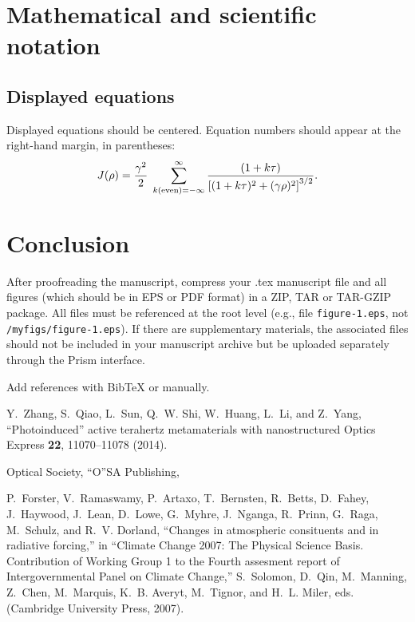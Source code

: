 \documentclass[twocolumn]{article}
\begin{document}
\section{Mathematical and scientific notation}

\subsection{Displayed equations} Displayed equations should be centered.
Equation numbers should appear at the right-hand margin, in
parentheses:
\begin{equation}
J(\rho) =
 \frac{\gamma^2}{2} \; \sum_{k({\rm even}) = -\infty}^{\infty}
	\frac{(1 + k \tau)}{ \left[ (1 + k \tau)^2 + (\gamma  \rho)^2  \right]^{3/2} }.
\end{equation}

\section{Conclusion}
After proofreading the manuscript, compress your .tex manuscript file and all figures (which should be in EPS or PDF format) in a ZIP, TAR or TAR-GZIP package. All files must be referenced at the root level (e.g., file \texttt{figure-1.eps}, not \texttt{/myfigs/figure-1.eps}). If there are supplementary materials, the associated files should not be included in your manuscript archive but be uploaded separately through the Prism interface.

Add references with BibTeX or manually.



\begin{thebibliography}{1}
\newcommand{\enquote}[1]{``#1''}

 Y.~Zhang, S.~Qiao, L.~Sun, Q.~W. Shi, W.~Huang, L.~Li, and Z.~Yang,
   \enquote{Photoinduced} active terahertz metamaterials with nanostructured
    Optics Express \textbf{22}, 11070--11078 (2014).

 Optical Society, 
 \enquote OSA Publishing, 

 P.~Forster, V.~Ramaswamy, P.~Artaxo, T.~Bernsten, R.~Betts, D.~Fahey,
   J.~Haywood, J.~Lean, D.~Lowe, G.~Myhre, J.~Nganga, R.~Prinn, G.~Raga,
   M.~Schulz, and R.~V. Dorland, \enquote{Changes in atmospheric consituents and
   in radiative forcing,} in \enquote{Climate Change 2007: The Physical Science
   Basis. Contribution of Working Group 1 to the Fourth assesment report of
   Intergovernmental Panel on Climate Change,}  S.~Solomon, D.~Qin, M.~Manning,
   Z.~Chen, M.~Marquis, K.~B. Averyt, M.~Tignor, and H.~L. Miler, eds.
   (Cambridge University Press, 2007).

\end{thebibliography}
\end{document}

